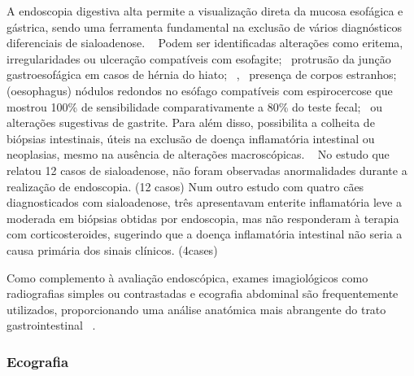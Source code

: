 A endoscopia digestiva alta permite a visualização direta da mucosa esofágica e gástrica, sendo uma ferramenta fundamental na exclusão de vários diagnósticos diferenciais de sialoadenose. ~\cite{lhermette_bsava_2021} Podem ser identificadas alterações como eritema, irregularidades ou ulceração compatíveis com esofagite;~\cite{lhermette_bsava_2021} protrusão da junção gastroesofágica em casos de hérnia do hiato; ~\cite{Kim2021},~\cite{Broux2018} presença de corpos estranhos;(oesophagus) nódulos redondos no esófago compatíveis com espirocercose que mostrou 100\% de sensibilidade comparativamente a 80\% do teste fecal;~\cite{vanderMerwe2008,mylonakis_canine_2008} ou alterações sugestivas de gastrite. Para além disso, possibilita a colheita de biópsias intestinais, úteis na exclusão de doença inflamatória intestinal ou neoplasias, mesmo na ausência de alterações macroscópicas. ~\cite{Cerquetella2010} No estudo que relatou 12 casos de sialoadenose, não foram observadas anormalidades durante a realização de endoscopia. (12 casos) Num outro estudo com quatro cães diagnosticados com sialoadenose, três apresentavam enterite inflamatória leve a moderada em biópsias obtidas por endoscopia, mas não responderam à terapia com corticosteroides, sugerindo que a doença inflamatória intestinal não seria a causa primária dos sinais clínicos. (4cases)


Como complemento à avaliação endoscópica, exames imagiológicos como radiografias simples ou contrastadas e ecografia abdominal são frequentemente utilizados, proporcionando uma análise anatómica mais abrangente do trato gastrointestinal ~\cite{mccarthy_veterinary_2021}.


\subsubsection{Ecografia}


